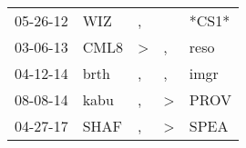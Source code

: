 \begin{supertabular}{p{0.07\textwidth}p{0.06\textwidth}p{0.02\textwidth}p{0.02\textwidth}p{0.06\textwidth}}
 05-26-12\textsuperscript{} &            WIZ\textsuperscript{} &                , &               &                           *CS1* \\
 03-06-13\textsuperscript{} &           CML8\textsuperscript{} &     \textgreater &             , &          reso\textsuperscript{} \\
 04-12-14\textsuperscript{} &           brth\textsuperscript{} &                , &             , &          imgr\textsuperscript{} \\
 08-08-14\textsuperscript{} &           kabu\textsuperscript{} &                , &  \textgreater &          PROV\textsuperscript{} \\
 04-27-17\textsuperscript{} &           SHAF\textsuperscript{} &                , &  \textgreater &          SPEA\textsuperscript{} \\
\end{supertabular}
